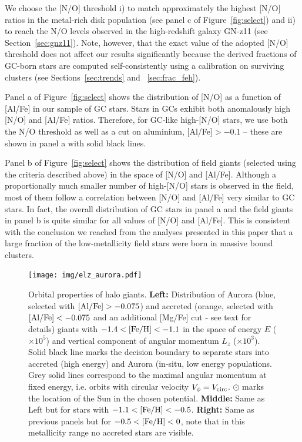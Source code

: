 \documentclass[a4paper,useAMS,usenatbib]{mnras}
\begin{document}
We choose the [N/O] threshold i) to match approximately the highest [N/O] ratios in the metal-rich disk population (see panel c of Figure~\ref{fig:select}) and ii) to reach the N/O levels observed in the high-redshift galaxy GN-z11 (see Section~\ref{sec:gnz11}). Note, however, that the exact value of the adopted [N/O] threshold does not affect our results significantly because the derived fractions of GC-born stars are computed self-consistently using a calibration on surviving clusters (see Sections~\ref{sec:trends} and ~\ref{sec:frac_feh}). 

Panel a of Figure~\ref{fig:select} shows the distribution of [N/O] as a function of [Al/Fe] in our sample of GC stars. Stars in GCs exhibit both anomalously high [N/O] and [Al/Fe] ratios. Therefore, for GC-like high-[N/O] stars, we use both the N/O threshold as well as a cut on aluminium, [Al/Fe]$>-0.1$ -- these are shown in panel a with solid black lines. 

Panel b of Figure~\ref{fig:select}  shows the distribution of field giants (selected using the criteria described above) in the space of [N/O] and [Al/Fe]. Although a proportionally much smaller number of high-[N/O] stars is observed in the field, most of them follow a correlation between [N/O] and [Al/Fe] very similar to GC stars. In fact, the overall distribution of GC stars in panel a and the field giants in panel b is quite similar for all values of [N/O] and [Al/Fe]. This is consistent with the conclusion we reached from the analyses presented in this paper that a large fraction of the low-metallicity field stars were born in massive bound clusters.

%
\begin{figure}
  \centering
  \texttt{[image: img/elz\_aurora.pdf]}
  \caption[]{Orbital properties of halo giants. {\bf Left:} Distribution of Aurora (blue, selected with $\rm [Al/Fe]>-0.075$) and accreted (orange, selected with $\rm [Al/Fe]<-0.075$ and an additional [Mg/Fe] cut - see text for details) giants with $-1.4<\rm [Fe/H]<-1.1$ in the space of energy $E$ ($\times10^{5}$) and vertical component of angular momentum $L_z$ ($\times10^{3}$).  Solid black line marks the decision boundary to separate stars into accreted (high energy) and Aurora (in-situ, low energy populations. Grey solid lines correspond to the maximal angular momentum at fixed energy, i.e. orbits with circular velocity $V_{\phi}=V_{\rm circ}$. $\odot$ marks the location of the Sun in the chosen potential. {\bf Middle:} Same as Left but for stars with $-1.1<\rm [Fe/H]<-0.5$. {\bf Right:} Same as previous panels but for $-0.5<\rm [Fe/H]<0$, note that in this metallicity range no accreted stars are visible.}
   \label{fig:elz_aurora}
\end{figure}
%
\end{document}
